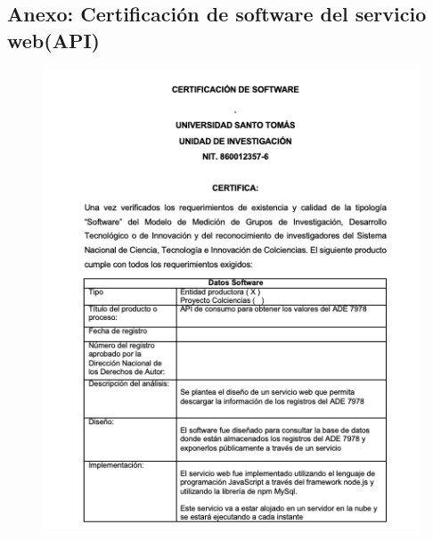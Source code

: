 \begin{appendix}
\chapter{ Anexo: Certificación de software del servicio web(API)}
\begin{figure}[H]
    \centering
    \includegraphics[width = 14cm]{Anexos/api-1.png}
    \label{fig:api1}
\end{figure}
\begin{figure}[H]
    \centering

\end{figure}
\end{appendix}
